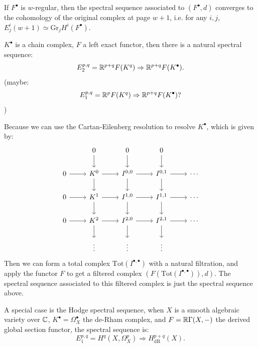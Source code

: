 \documentclass[12pt]{amsart}
\numberwithin{equation}{section}
\begin{document}
\begin{thm}
  If $F^{\bullet}$ is $w$-regular, then the spectral sequence associated to $(F^{\bullet},d)$ converges to the cohomology of the original complex at page $w+1$, i.e. for any $i,j$, $E^i_j(w+1) \simeq \mathrm{Gr}_j H^i(F^{\bullet})$.
\end{thm}


\begin{examp}
  $K^{\bullet}$ is a chain complex, $F$ a left exact functor, then there is a natural spectral sequence:
  \[E^{p,q}_2 ={\mathbb {R}}^{p+q} F(K^{q}) \Rightarrow {\mathbb {R}}^{p+q} F(K^{\bullet}).\]
  (maybe:
  \[E^{p,q}_1 = {\mathbb {R}}^{p} F(K^{q}) \Rightarrow {\mathbb {R}}^{p+q} F(K^{\bullet})?\])
  
  Because we can use the Cartan-Eilenberg resolution to resolve $K^{\bullet}$, which is given by:
  \[
  \begin{tikzcd}
    & 0 \arrow[d] & 0 \arrow[d] & 0 \arrow[d] & \\
    0 \arrow[r] & K^0 \arrow[r] \arrow[d] & I^{0,0} \arrow[r] \arrow[d] & I^{0,1} \arrow[r] \arrow[d] & \cdots \\
    0 \arrow[r] & K^1 \arrow[r] \arrow[d] & I^{1,0} \arrow[r] \arrow[d] & I^{1,1} \arrow[r] \arrow[d] & \cdots \\
    0 \arrow[r] & K^2 \arrow[r] \arrow[d] & I^{2,0} \arrow[r] \arrow[d] & I^{2,1} \arrow[r] \arrow[d] & \cdots \\
    & \vdots & \vdots & \vdots &
  \end{tikzcd}
  \]
  Then we can form a total complex $\mathrm{Tot}(I^{\bullet,\bullet})$ with a natural filtration, and apply the functor $F$ to get a filtered complex $(F(\mathrm{Tot}(I^{\bullet,\bullet})),d)$. The spectral sequence associated to this filtered complex is just the spectral sequence above.

  A special case is the Hodge spectral sequence, when $X$ is a smooth algebraic variety over ${\mathbb {C}}$, $K^{\bullet} = \Omega^{\bullet}_X$ the de-Rham complex, and $F = {\mathbb {R}} \Gamma(X,-)$ the derived global section functor, the spectral sequence is:
  \[E^{p,q}_1 = H^q(X,\Omega^p_X) \Rightarrow H^{p+q}_{\mathrm{dR}}(X).\]
\end{examp}

\end{document}
